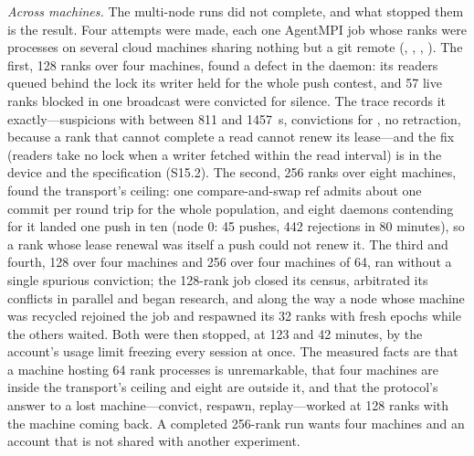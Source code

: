 \emph{Across machines.}  The multi-node runs did not complete, and what
stopped them is the result.  Four attempts were made, each one AgentMPI job whose
ranks were processes on several cloud machines sharing nothing but a git remote
(, , ,
).  The first, 128 ranks over four machines, found a defect
in the daemon: its readers queued behind the lock its writer held for the whole
push contest, and 57 live ranks blocked in one broadcast were convicted for
silence.  The trace records it exactly---suspicions with 
between 811 and 1457~s, convictions for , no retraction,
because a rank that cannot complete a read cannot renew its lease---and the fix
(readers take no lock when a writer fetched within the read interval) is in the
device and the specification (S15.2).  The second, 256 ranks over eight
machines, found the transport's ceiling: one compare-and-swap ref admits about
one commit per round trip for the whole population, and eight daemons contending
for it landed one push in ten (node 0: 45 pushes, 442 rejections in 80 minutes),
so a rank whose lease renewal was itself a push could not renew it.  The third
and fourth, 128 over four machines and 256 over four machines of 64, ran without
a single spurious conviction; the 128-rank job closed its census, arbitrated its
conflicts in parallel and began research, and along the way a node whose machine
was recycled rejoined the job and respawned its 32 ranks with fresh epochs while
the others waited.  Both were then stopped, at 123 and 42 minutes, by the
account's usage limit freezing every session at once.  The measured facts are
that a machine hosting 64 rank processes is unremarkable, that four machines are
inside the transport's ceiling and eight are outside it, and that the protocol's
answer to a lost machine---convict, respawn, replay---worked at 128 ranks with
the machine coming back.  A completed 256-rank run wants four machines and an
account that is not shared with another experiment.
